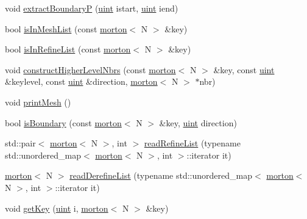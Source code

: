 \begin{DoxyCompactItemize}
\item 
void \mbox{\hyperlink{classTree_a9e107129872bf20de6ea619136a74929}{extract\+BoundaryP}} (\mbox{\hyperlink{definitions_8h_a69aa29b598b851b0640aa225a9e5d61d}{uint}} istart, \mbox{\hyperlink{definitions_8h_a69aa29b598b851b0640aa225a9e5d61d}{uint}} iend)
\item 
bool \mbox{\hyperlink{classTree_af672673619621aa27e5e0c35dd3449d2}{is\+In\+Mesh\+List}} (const \mbox{\hyperlink{definitions_8h_af8682350bd8bb38ee9023f7a0a310add}{morton}}$<$ N $>$ \&key)
\item 
bool \mbox{\hyperlink{classTree_a78d174e942a78fa20ac98db8c98ae6be}{is\+In\+Refine\+List}} (const \mbox{\hyperlink{definitions_8h_af8682350bd8bb38ee9023f7a0a310add}{morton}}$<$ N $>$ \&key)
\item 
void \mbox{\hyperlink{classTree_abe71f9daa0c90b01a9144ade766c500f}{construct\+Higher\+Level\+Nbrs}} (const \mbox{\hyperlink{definitions_8h_af8682350bd8bb38ee9023f7a0a310add}{morton}}$<$ N $>$ \&key, const \mbox{\hyperlink{definitions_8h_a69aa29b598b851b0640aa225a9e5d61d}{uint}} \&keylevel, const \mbox{\hyperlink{definitions_8h_a69aa29b598b851b0640aa225a9e5d61d}{uint}} \&direction, \mbox{\hyperlink{definitions_8h_af8682350bd8bb38ee9023f7a0a310add}{morton}}$<$ N $>$ $\ast$nbr)
\item 
void \mbox{\hyperlink{classTree_a76dbe79f57a7f640a6427f4bb4c4adef}{print\+Mesh}} ()
\item 
bool \mbox{\hyperlink{classTree_a1fc56044946bc23f6c31c103c30d25fa}{is\+Boundary}} (const \mbox{\hyperlink{definitions_8h_af8682350bd8bb38ee9023f7a0a310add}{morton}}$<$ N $>$ \&key, \mbox{\hyperlink{definitions_8h_a69aa29b598b851b0640aa225a9e5d61d}{uint}} direction)
\item 
std\+::pair$<$ \mbox{\hyperlink{definitions_8h_af8682350bd8bb38ee9023f7a0a310add}{morton}}$<$ N $>$, int $>$ \mbox{\hyperlink{classTree_ae4cedc682194265e242bc37bc3df1386}{read\+Refine\+List}} (typename std\+::unordered\+\_\+map$<$ \mbox{\hyperlink{definitions_8h_af8682350bd8bb38ee9023f7a0a310add}{morton}}$<$ N $>$, int $>$\+::iterator it)
\item 
\mbox{\hyperlink{definitions_8h_af8682350bd8bb38ee9023f7a0a310add}{morton}}$<$ N $>$ \mbox{\hyperlink{classTree_acc8f2387fd43e2d148c7a800eddd0c31}{read\+Derefine\+List}} (typename std\+::unordered\+\_\+map$<$ \mbox{\hyperlink{definitions_8h_af8682350bd8bb38ee9023f7a0a310add}{morton}}$<$ N $>$, int $>$\+::iterator it)
\item 
void \mbox{\hyperlink{classTree_a7c243257bc4cbe0cec0d5b1a2098782c}{get\+Key}} (\mbox{\hyperlink{definitions_8h_a69aa29b598b851b0640aa225a9e5d61d}{uint}} i, \mbox{\hyperlink{definitions_8h_af8682350bd8bb38ee9023f7a0a310add}{morton}}$<$ N $>$ \&key)

\end{DoxyCompactItemize}
